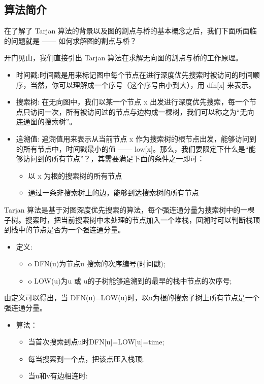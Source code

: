 \documentclass[9pt, b5paaper]{book}
\begin{document}
\subsection{算法简介}
\label{sec-1-3-1}

在了解了 Tarjan 算法的背景以及图的割点与桥的基本概念之后，我们下面所面临的问题就是 —— 如何求解图的割点与桥？

开门见山，我们直接引出 Tarjan 算法在求解无向图的割点与桥的工作原理。

\begin{itemize}
\item 时间戳: ​时间戳是用来标记图中每个节点在进行深度优先搜索时被访问的时间顺序，当然，你可以理解成一个序号（这个序号由小到大），用 dfn[x] 来表示。
\item 搜索树: 在无向图中，我们以某一个节点 x 出发进行深度优先搜索，每一个节点只访问一次，所有被访问过的节点与边构成一棵树，我们可以称之为“无向连通图的搜索树”。
\item 追溯值: 追溯值用来表示从当前节点 x 作为搜索树的根节点出发，能够访问到的所有节点中，时间戳最小的值 —— low[x]。那么，我们要限定下什么是“能够访问到的所有节点”？，其需要满足下面的条件之一即可：
\begin{itemize}
\item 以 x 为根的搜索树的所有节点
\item 通过一条非搜索树上的边，能够到达搜索树的所有节点
\end{itemize}
\end{itemize}

Tarjan 算法是基于对图深度优先搜索的算法，每个强连通分量为搜索树中的一棵子树。搜索时，把当前搜索树中未处理的节点加入一个堆栈，回溯时可以判断栈顶到栈中的节点是否为一个强连通分量。

\begin{itemize}
\item 定义:
\begin{itemize}
\item o DFN(u)为节点u 搜索的次序编号(时间戳);
\item o LOW(u)为u 或 u的子树能够追溯到的最早的栈中节点的次序号;
\end{itemize}
\end{itemize}

由定义可以得出，当 DFN(u)=LOW(u)时，以u为根的搜索子树上所有节点是一个强连通分量。

\begin{itemize}
\item 算法：
\begin{itemize}
\item 当首次搜索到点u时DFN[u]=LOW[u]=time;
\item 每当搜索到一个点，把该点压入栈顶;
\item 当u和v有边相连时:
\end{itemize}
\end{itemize}
\end{document}
